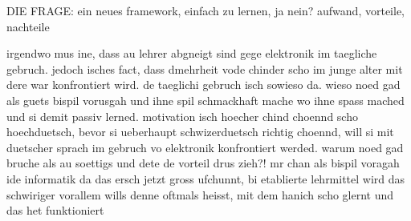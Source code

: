 DIE FRAGE: ein neues framework, einfach zu lernen, ja nein? aufwand, vorteile, nachteile

irgendwo mus ine, dass au lehrer abgneigt sind gege elektronik im taegliche gebruch. jedoch isches fact, 
dass dmehrheit vode chinder scho im junge alter mit dere war konfrontiert wird. de taeglichi gebruch isch sowieso da. 
wieso noed gad als guets bispil vorusgah und ihne spil schmackhaft mache wo ihne spass mached und si demit passiv lerned. 
motivation isch hoecher
chind choennd scho hoechduetsch, bevor si ueberhaupt schwizerduetsch richtig choennd, will si mit duetscher sprach im gebruch vo elektronik
konfrontiert werded. warum noed gad bruche als au soettigs und dete de vorteil drus zieh?! mr chan als bispil voragah ide informatik
da das ersch jetzt gross ufchunnt, bi etablierte lehrmittel wird das schwiriger vorallem wills denne oftmals heisst, 
mit dem hanich scho glernt und das het funktioniert
